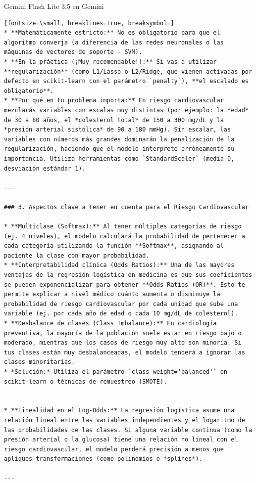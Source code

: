 \documentclass[12pt,a4paper,oneside]{book}
\begin{document}
\begin{iaresp}{Gemini Flash Lite 3.5 en Gemini}
\begin{Verbatim}[fontsize=\small, breaklines=true, breaksymbol=]
* **Matemáticamente estricto:** No es obligatorio para que el algoritmo converja (a diferencia de las redes neuronales o las máquinas de vectores de soporte - SVM).
* **En la práctica (¡Muy recomendable!):** Si vas a utilizar **regularización** (como L1/Lasso o L2/Ridge, que vienen activadas por defecto en scikit-learn con el parámetro `penalty`), **el escalado es obligatorio**.
* **Por qué en tu problema importa:** En riesgo cardiovascular mezclarás variables con escalas muy distintas (por ejemplo: la *edad* de 30 a 80 años, el *colesterol total* de 150 a 300 mg/dL y la *presión arterial sistólica* de 90 a 180 mmHg). Sin escalar, las variables con números más grandes dominarán la penalización de la regularización, haciendo que el modelo interprete erróneamente su importancia. Utiliza herramientas como `StandardScaler` (media 0, desviación estándar 1).

---

### 3. Aspectos clave a tener en cuenta para el Riesgo Cardiovascular

* **Multiclase (Softmax):** Al tener múltiples categorías de riesgo (ej. 4 niveles), el modelo calculará la probabilidad de pertenecer a cada categoría utilizando la función **Softmax**, asignando al paciente la clase con mayor probabilidad.
* **Interpretabilidad clínica (Odds Ratios):** Una de las mayores ventajas de la regresión logística en medicina es que sus coeficientes se pueden exponencializar para obtener **Odds Ratios (OR)**. Esto te permite explicar a nivel médico cuánto aumenta o disminuye la probabilidad de riesgo cardiovascular por cada unidad que sube una variable (ej. por cada año de edad o cada 10 mg/dL de colesterol).
* **Desbalance de clases (Class Imbalance):** En cardiología preventiva, la mayoría de la población suele estar en riesgo bajo o moderado, mientras que los casos de riesgo muy alto son minoría. Si tus clases están muy desbalanceadas, el modelo tenderá a ignorar las clases minoritarias.
* *Solución:* Utiliza el parámetro `class_weight='balanced'` en scikit-learn o técnicas de remuestreo (SMOTE).


* **Linealidad en el Log-Odds:** La regresión logística asume una relación lineal entre las variables independientes y el logaritmo de las probabilidades de las clases. Si alguna variable continua (como la presión arterial o la glucosa) tiene una relación no lineal con el riesgo cardiovascular, el modelo perderá precisión a menos que apliques transformaciones (como polinomios o *splines*).

---
\end{Verbatim}
\end{iaresp}
\end{document}
